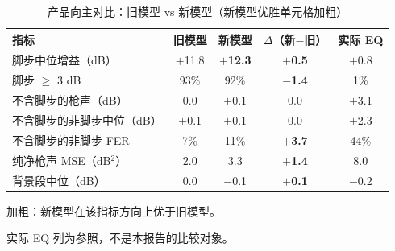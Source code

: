 \begin{table}[htbp]\centering
\caption{产品向主对比：旧模型 vs 新模型（新模型优胜单元格加粗）}\label{tab:nm_product}
{\small\begin{threeparttable}
\begin{tabularx}{\linewidth}{Lcccc}\toprule
指标 & 旧模型 & 新模型 & $\Delta$（新$-$旧） & 实际 EQ \\
\midrule
脚步中位增益（dB） & $+$11.8 & \textbf{$+$12.3} & \textcolor{good}{\textbf{$+$0.5}} & $+$0.8 \\
脚步 $\geq$ 3 dB & 93\% & 92\% & \textcolor{bad}{\textbf{$-$1.4}} & 1\% \\
不含脚步的枪声（dB） & 0.0 & $+$0.1 & 0.0 & $+$3.1 \\
不含脚步的非脚步中位（dB） & $+$0.1 & $+$0.1 & 0.0 & $+$2.3 \\
不含脚步的非脚步 FER & 7\% & 11\% & \textcolor{bad}{\textbf{$+$3.7}} & 44\% \\
纯净枪声 MSE（dB$^{2}$） & 2.0 & 3.3 & \textcolor{bad}{\textbf{$+$1.4}} & 8.0 \\
背景段中位（dB） & 0.0 & $-$0.1 & \textcolor{bad}{\textbf{$+$0.1}} & $-$0.2 \\
\bottomrule\end{tabularx}
\begin{tablenotes}\footnotesize\item 加粗：新模型在该指标方向上优于旧模型。\item 实际 EQ 列为参照，不是本报告的比较对象。\end{tablenotes}\end{threeparttable}}
\end{table}
